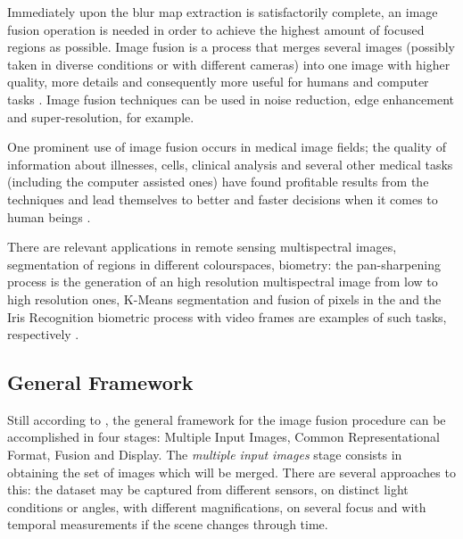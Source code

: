 Immediately upon the blur map extraction is satisfactorily complete, an image fusion operation is needed in order to achieve the highest amount of focused regions as possible. Image fusion is a process that merges several images (possibly taken in diverse conditions or with different cameras) into one image with higher quality, more details and consequently more useful for humans and computer tasks \cite{mitchell2010image}. Image fusion techniques can be used in noise reduction, edge enhancement and super-resolution, for example. 




One prominent use of image fusion occurs in medical image fields; the quality of information about illnesses, cells, clinical analysis and several other medical tasks (including the computer assisted ones) have found profitable results from the techniques and lead themselves to better and faster decisions when it comes to human beings \cite{james2014medical}.

There are relevant applications in remote sensing multispectral images, segmentation of regions in different colourspaces, biometry: the pan-sharpening process is the generation of an high resolution multispectral image from low to high resolution ones, K-Means segmentation and fusion of pixels in the  and the Iris Recognition biometric process with video frames are examples of such tasks, respectively \cite{mitchell2010image}.

\subsection{General Framework}

Still according to , the general framework for the image fusion procedure can be accomplished in four stages: Multiple Input Images, Common Representational Format, Fusion and Display.
The \emph{multiple input images} stage consists in obtaining the set of images which will be merged. There are several approaches to this: the dataset may be captured from different sensors, on distinct light conditions or angles, with different magnifications, on several focus and with temporal measurements if the scene changes through time.

